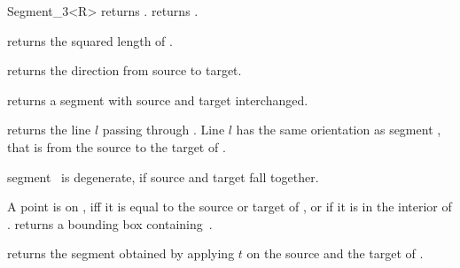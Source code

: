 \begin{ccRefClass} {Segment_3<R>}
       {returns .}
\ccGlue
{}
       {returns .}

       {returns the squared length of \ccVar. }

       {returns the direction from source to target.}


       {returns a segment with source and target interchanged.}

       {returns the line $l$ passing through \ccVar. Line $l$  has the
        same orientation as segment \ccVar, that is 
        from the source to the target of \ccVar.}

       {segment \ccVar\ is degenerate, if source and target fall together.}


       {A point is on \ccVar, iff it is equal to the source or target
        of \ccVar, or if it is in the interior of \ccVar.}
% 
% 
       {returns a bounding box containing~\ccVar.}

       {returns the segment obtained by applying $t$ on the source
        and the target of \ccVar.}

\ccSeeAlso
{}\\

\end{ccRefClass} 

